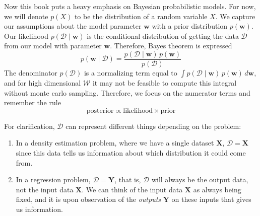 \documentclass{article}
\begin{document}
    Now this book puts a heavy emphasis on Bayesian probabilistic models. For now, we will denote $p(X)$ to be the distribution of a random variable $X$. We capture our assumptions about the model parameter $\mathbf{w}$ with a prior distribution $p(\mathbf{w})$. Our likelihood $p(\mathcal{D} \mid \mathbf{w})$ is the conditional distribution of getting the data $\mathcal{D}$ from our model with parameter $\mathbf{w}$. Therefore, Bayes theorem is expressed 
    \[p(\mathbf{w} \mid \mathcal{D}) = \frac{p(\mathcal{D} \mid \mathbf{w}) \, p(\mathbf{w})}{p(\mathcal{D})}\]
    The denominator $p(\mathcal{D})$ is a normalizing term equal to $\int p(\mathcal{D} \mid \mathbf{w}) \, p(\mathbf{w}) \,d\mathbf{w}$, and for high dimensional $\mathcal{W}$ it may not be feasible to compute this integral without monte carlo sampling. Therefore, we focus on the numerator terms and remember the rule 
    \[\text{posterior} \propto \text{likelihood} \times \text{prior}\]

    For clarification, $\mathcal{D}$ can represent different things depending on the problem: 
    \begin{enumerate}
        \item In a density estimation problem, where we have a single dataset $\mathbf{X}$, $\mathcal{D} = \mathbf{X}$ since this data tells us information about which distribution it could come from. 
        \item In a regression problem, $\mathcal{D} = \mathbf{Y}$, that is, $\mathcal{D}$ will always be the output data, not the input data $\mathbf{X}$. We can think of the input data $\mathbf{X}$ as always being fixed, and it is upon observation of the \textit{outputs} $\mathbf{Y}$ on these inputs that gives us information. 
    \end{enumerate}
\end{document}
